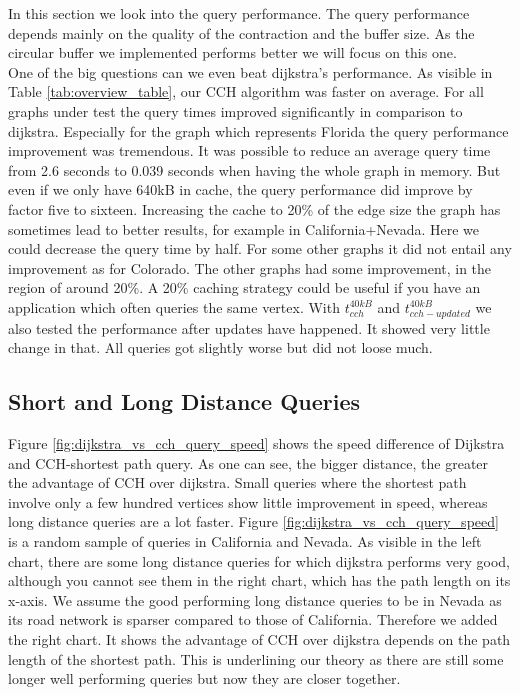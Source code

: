 In this section we look into the query performance.
The query performance depends mainly on the quality of the contraction and the buffer size.
As the circular buffer we implemented performs better we will focus on this one.
\\ 
One of the big questions can we even beat dijkstra's performance.
As visible in Table \ref{tab:overview_table}, our CCH algorithm was faster on average.
For all graphs under test the query times improved significantly in comparison to dijkstra.
Especially for the graph which represents Florida the query performance improvement was tremendous.
It was possible to reduce an average query time from 2.6 seconds to 0.039 seconds when having the whole graph in memory.
But even if we only have 640kB in cache, the query performance did improve by factor five to sixteen.
Increasing the cache to 20\% of the edge size the graph has sometimes lead to better results, for example in California+Nevada.
Here we could decrease the query time by half.
For some other graphs it did not entail any improvement as for Colorado.
The other graphs had some improvement, in the region of around 20\%.
A 20\% caching strategy could be useful if you have an application which often queries the same vertex.
With $t^{40kB}_{cch}$ and $t^{40kB}_{cch-updated}$ we also tested the performance after updates have happened.
It showed very little change in that.
All queries got slightly worse but did not loose much.

\subsection{Short and Long Distance Queries}

Figure \ref{fig:dijkstra_vs_cch_query_speed} shows the speed difference of Dijkstra and CCH-shortest path query.
As one can see, the bigger distance, the greater the advantage of CCH over dijkstra.
Small queries where the shortest path involve only a few hundred vertices show little improvement in speed, whereas long distance queries are a lot faster.
Figure \ref{fig:dijkstra_vs_cch_query_speed} is a random sample of queries in California and Nevada.
As visible in the left chart, there are some long distance queries for which dijkstra performs very good, although you cannot see them in the right chart, which has the path length on its x-axis.
We assume the good performing long distance queries to be in Nevada as its road network is sparser compared to those of California.
Therefore we added the right chart.
It shows the advantage of CCH over dijkstra depends on the path length of the shortest path.
This is underlining our theory as there are still some longer well performing queries but now they are closer together.

